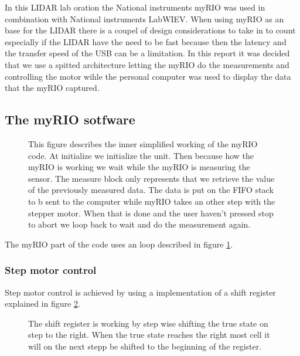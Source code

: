 In this LIDAR lab oration the National instruments myRIO was used in combination with National instruments LabWIEV. 
When using myRIO as an base for the LIDAR there is a coupel of design considerations to take in to count especially if the LIDAR have the need to be fast because then the latency and the transfer speed of the USB can be a limitation. 
In this report it was decided that we use a spitted architecture letting the myRIO do the measurements and controlling the motor wihle the personal computer was used to display the data that the myRIO captured.
\subsection{The myRIO sotfware}\label{subsection:myRIO}
\begin{figure}[ht]
    
  \caption{This figure describes the inner simplified working of the myRIO code.
  At initialize we initialize the unit. Then because how the myRIO is working we wait while the myRIO is measuring the sensor. The measure block only represents that we retrieve the value of the previously measured data. The data is put on the FIFO stack to b sent to the computer while myRIO takes an other step with the stepper motor. When that is done and the user haven't pressed stop to abort we loop back to wait and do the measurement again.}
  \label{fig:myRIO-loop}
\end{figure}
The myRIO part of the code uses an loop described in figure \ref{fig:myRIO-loop}.
\subsubsection{Step motor control}\label{subsubsection:Step-control}
Step motor control is achieved by using a implementation of a shift register explained in figure \ref{fig:shift-reg}. 
\begin{figure}[ht]
   
  \caption{The shift register is working by step wise shifting the true state on step to the right. When the true state reaches the right most cell it will on the next stepp be shifted to the beginning of the register.}
  \label{fig:shift-reg}
\end{figure}